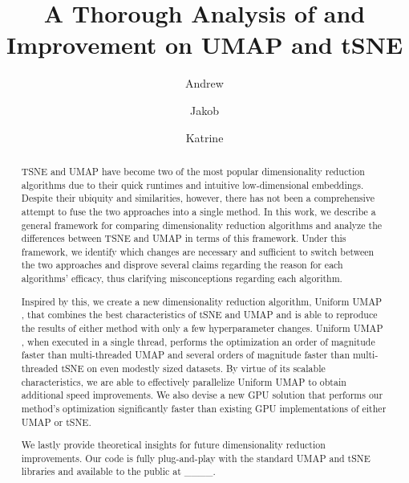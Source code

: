 \documentclass[sigconf, nonacm]{acmart}
\newcommand\ourmethod{Uniform UMAP }
\begin{document}
\title{A Thorough Analysis of and Improvement on UMAP and tSNE}

\author{Andrew}
\author{Jakob}
\author{Katrine}
\begin{abstract}
TSNE and UMAP have become two of the most popular dimensionality reduction algorithms due to their quick runtimes and intuitive low-dimensional embeddings.
Despite their ubiquity and similarities, however, there has not been a comprehensive attempt to fuse the two approaches into a single method. In this work, we
describe a general framework for comparing dimensionality reduction algorithms and analyze the differences between TSNE and UMAP in terms of this framework.
Under this framework, we identify which changes are necessary and sufficient to switch between the two approaches and disprove several claims regarding the
reason for each algorithms' efficacy, thus clarifying misconceptions regarding each algorithm.

Inspired by this, we create a new dimensionality reduction algorithm, \ourmethod, that combines the best characteristics of tSNE
and UMAP and is able to reproduce the results of either method with only a few hyperparameter changes. \ourmethod, when executed in a single thread, performs the optimization an order of magnitude faster than
multi-threaded UMAP and several orders of magnitude faster than multi-threaded tSNE on even modestly sized datasets. By virtue of its scalable characteristics,
we are able to effectively parallelize \ourmethod to obtain additional speed improvements. We also devise a new GPU
solution that performs our method's optimization significantly faster than existing GPU implementations of either UMAP or tSNE.

We lastly provide theoretical insights for future dimensionality reduction improvements. Our code is fully plug-and-play with the standard UMAP and tSNE
libraries and available to the public at \_\_\_\_.
\end{abstract}

\maketitle
\end{document}
